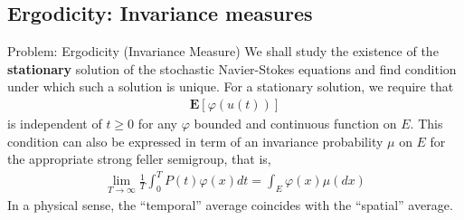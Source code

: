 \documentclass[xcolor=dvipsnames,leqno]{beamer}
\begin{document}
\subsection{Ergodicity: Invariance measures}
\begin{frame}{Problem: Ergodicity (Invariance Measure)}
We shall study the existence of the \textbf{stationary} solution of the stochastic Navier-Stokes equations and find condition under which such a solution is unique. For a stationary solution, we require that 
	\begin{align*}
		\mathbf{E}[\varphi(u(t))]
	\end{align*}
is independent of $t\geq 0$ for any $\varphi$ bounded and continuous function on $E$. 	This condition can also be expressed in term of an invariance probability $\mu$ on $E$ for the appropriate strong feller semigroup, that is, 	
\begin{align*}
			\lim_{T\to\infty}\frac{1}{T}\int_{0}^{T}P(t)\varphi(x)dt=\int_{E}\varphi(x)\mu(dx)
\end{align*}    
		In a physical sense, the ``temporal'' average coincides with the ``spatial'' average.
\end{frame}
\end{document}
